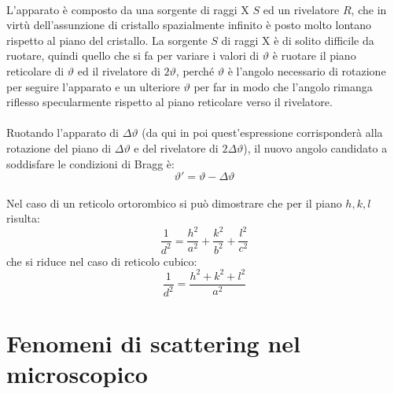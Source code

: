 \documentclass{book}
\begin{document}
                \paragraph{}
                    L'apparato è composto da una sorgente di raggi X $S$ ed un rivelatore $R$, che in virtù dell'assunzione di cristallo spazialmente infinito è posto molto lontano rispetto al piano del cristallo.\newline
                    La sorgente $S$ di raggi X è di solito difficile da ruotare, quindi quello che si fa per variare i valori di $\vartheta$ è ruotare il piano reticolare di $\vartheta$ ed il rivelatore di $2 \vartheta$, perché $\vartheta$ è l'angolo necessario di rotazione per seguire l'apparato e un ulteriore $\vartheta$ per far in modo che l'angolo rimanga riflesso specularmente rispetto al piano reticolare verso il rivelatore.

                    \paragraph{}
                        Ruotando l'apparato di $\Delta \vartheta$ (da qui in poi quest'espressione corrisponderà alla rotazione del piano di $\Delta \vartheta$ e del rivelatore di $2 \Delta \vartheta$), il nuovo angolo candidato a soddisfare le condizioni di Bragg è:
                        $$\vartheta ' = \vartheta - \Delta \vartheta$$
                    \paragraph{}
                        Nel caso di un reticolo ortorombico si può dimostrare che per il piano $h,k,l$ risulta:
                        $$\frac{1}{d^{2}} = \frac{h^{2}}{a^{2}}+\frac{k^{2}}{b^{2}}+\frac{l^{2}}{c^{2}}$$
                        che si riduce nel caso di reticolo cubico:
                        $$\frac{1}{d^{2}} = \frac{h^{2}+k^{2}+l^{2}}{a^{2}}$$


        \section{Fenomeni di scattering nel microscopico}
\end{document}
